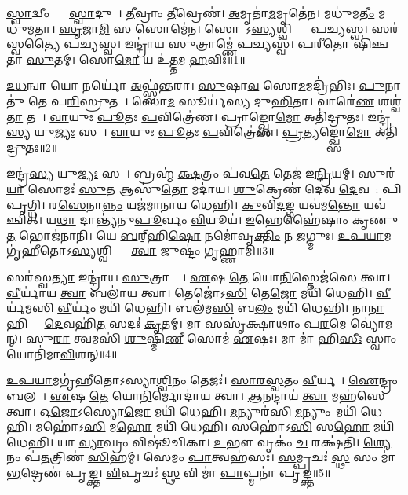 \clearpage
{}
\setcounter{anuvakam}{0}

\ul{𑌸𑍍𑌵𑌾}𑌦𑍍𑌵𑍀𑌂 𑌤𑍍𑌵𑌾᳚ \ul{𑌸𑍍𑌵𑌾}𑌦𑍁𑌨𑌾᳚।
\ul{𑌤𑍀}𑌵𑍍𑌰𑌾𑌂 \ul{𑌤𑍀}𑌵𑍍𑌰𑍇𑌣॑।
\ul{𑌅}𑌮𑍃𑌤𑌾॑\ul{𑌮}𑌮𑍃𑌤𑍇॑𑌨।
𑌮𑌧𑍁॑𑌮\ul{𑌤𑍀𑌂} 𑌮𑌧𑍁॑𑌮𑌤𑌾।
\ul{𑌸𑍃}𑌜𑌾\ul{𑌮𑌿} 𑌸 𑌸𑍋𑌮𑍇॑𑌨।
𑌸𑍋𑌮𑍋᳚\-𑌽\ul{𑌸𑍍𑌯}𑌶𑍍𑌵𑌿𑌭𑍍𑌯𑌾𑌂᳚ 𑌪𑌚𑍍𑌯𑌸𑍍𑌵।
𑌸𑌰॑𑌸𑍍𑌵𑌤𑍍𑌯𑍈 𑌪𑌚𑍍𑌯𑌸𑍍𑌵।
𑌇𑌨𑍍𑌦𑍍𑌰𑌾॑𑌯 \ul{𑌸𑍁}𑌤𑍍𑌰𑌾𑌮𑍍𑌣𑍇॑ 𑌪𑌚𑍍𑌯𑌸𑍍𑌵।
𑌪\ul{𑌰𑍀}𑌤𑍋 𑌷𑌿॑𑌞𑍍𑌚𑌤𑌾 \ul{𑌸𑍁}𑌤𑌮𑍍।
𑌸𑍋\ul{𑌮𑍋} 𑌯 𑌉॑\ul{𑌤𑍍𑌤}𑌮 \ul{𑌹}𑌵𑌿𑌃॥1॥

\ul{𑌦}\ul{𑌧}𑌨𑍍𑌵𑌾 𑌯𑍋 𑌨𑌰𑍍𑌯𑍋॑ \ul{𑌅}𑌫𑍍𑌸𑍍𑌵॑𑌨𑍍𑌤𑌰𑌾।
\ul{𑌸𑍁}𑌷𑌾\ul{𑌵} 𑌸𑍋\ul{𑌮}𑌮𑌦𑍍𑌰𑌿॑𑌭𑌿𑌃।
\ul{𑌪𑍁}𑌨𑌾𑌤𑍁॑ 𑌤𑍇 𑌪\ul{𑌰𑌿}𑌸𑍍𑌰𑍁𑌤𑌮𑍍᳚।
𑌸𑍋\ul{𑌮}\ul{} 𑌸𑍂𑌰𑍍𑌯॑𑌸𑍍𑌯 𑌦𑍁\ul{𑌹𑌿}𑌤𑌾।
𑌵𑌾𑌰𑍇॑\ul{𑌣} 𑌶𑌶𑍍𑌵॑\ul{𑌤𑌾} 𑌤𑌨𑌾᳚।
\ul{𑌵𑌾}𑌯𑍁𑌃 \ul{𑌪𑍂}𑌤𑌃 \ul{𑌪}𑌵𑌿𑌤𑍍𑌰𑍇॑𑌣।
𑌪𑍍𑌰𑌾𑌙𑍍𑌖𑍍𑌸𑍋\ul{𑌮𑍋} 𑌅𑌤𑌿॑𑌦𑍍𑌰𑍁𑌤𑌃।
𑌇𑌨𑍍𑌦𑍍𑌰॑\ul{𑌸𑍍𑌯} 𑌯𑍁\ul{𑌜𑍍𑌯𑌃} 𑌸𑌖𑌾᳚।
\ul{𑌵𑌾}𑌯𑍁𑌃 \ul{𑌪𑍂}𑌤𑌃 \ul{𑌪}𑌵𑌿𑌤𑍍𑌰𑍇॑𑌣।
\ul{𑌪𑍍𑌰}𑌤𑍍𑌯𑌙𑍍𑌖𑍍𑌸𑍋\ul{𑌮𑍋} 𑌅𑌤𑌿॑𑌦𑍍𑌰𑍁𑌤𑌃॥2॥

𑌇𑌨𑍍𑌦𑍍𑌰॑\ul{𑌸𑍍𑌯} 𑌯𑍁\ul{𑌜𑍍𑌯𑌃} 𑌸𑌖𑌾᳚।
𑌬𑍍𑌰𑌹𑍍𑌮॑ \ul{𑌕𑍍𑌷}𑌤𑍍𑌰𑌂 𑌪॑𑌵\ul{𑌤𑍇} 𑌤𑍇𑌜॑ 𑌇\ul{𑌨𑍍𑌦𑍍𑌰𑌿}𑌯𑌮𑍍।
𑌸𑍁𑌰॑\ul{𑌯𑌾} 𑌸𑍋𑌮𑌃॑ \ul{𑌸𑍁}𑌤 𑌆𑌸𑍁॑\ul{𑌤𑍋} 𑌮𑌦𑌾॑𑌯।
\ul{𑌶𑍁}𑌕𑍍𑌰𑍇𑌣॑ 𑌦𑍇𑌵 \ul{𑌦𑍇}𑌵𑌤𑌾᳚: 𑌪𑌿𑌪𑍃𑌗𑍍𑌧𑌿।
𑌰\ul{𑌸𑍇}𑌨𑌾\ul{𑌨𑍍𑌨𑌂} 𑌯𑌜॑𑌮𑌾𑌨𑌾𑌯 𑌧𑍇𑌹𑌿।
\ul{𑌕𑍁}𑌵𑌿\ul{𑌦}𑌙𑍍𑌗 𑌯𑌵॑𑌮\ul{𑌨𑍍𑌤𑍋} 𑌯𑌵॑𑌞𑍍𑌚𑌿𑌤𑍍।
𑌯\ul{𑌥𑌾} 𑌦𑌾𑌨𑍍𑌤𑍍𑌯॑𑌨𑍁\ul{𑌪𑍂}𑌰𑍍𑌵𑌂 \ul{𑌵𑌿}𑌯𑍂𑌯॑।
\ul{𑌇}𑌹𑍇𑌹𑍈॑𑌷𑌾𑌂 𑌕𑍃𑌣𑍁\ul{𑌤} 𑌭𑍋𑌜॑𑌨𑌾𑌨𑌿।
𑌯𑍇 \ul{𑌬}𑌰𑍍‌॒\mbox{}𑌹𑌿\ul{𑌷𑍋} 𑌨𑌮𑍋॑𑌵𑍃\ul{𑌕𑍍𑌤𑌿𑌂} 𑌨 \ul{𑌜}𑌗𑍍𑌮𑍁𑌃।
\ul{𑌉}\ul{𑌪}\ul{𑌯𑌾}𑌮𑌗𑍃॑𑌹𑍀𑌤𑍋\-𑌽\ul{𑌸𑍍𑌯}𑌶𑍍𑌵𑌿𑌭𑍍𑌯𑌾𑌂᳚ \ul{𑌤𑍍𑌵𑌾} 𑌜𑍁𑌷𑍍𑌟𑌂॑ 𑌗𑍃𑌹𑍍𑌣𑌾𑌮𑌿॥3॥

𑌸𑌰॑𑌸𑍍𑌵\ul{𑌤𑍍𑌯𑌾} 𑌇𑌨𑍍𑌦𑍍𑌰𑌾॑𑌯 \ul{𑌸𑍁}𑌤𑍍𑌰𑌾𑌮𑍍𑌣𑍇᳚।
\ul{𑌏}𑌷 \ul{𑌤𑍇} 𑌯𑍋\ul{𑌨𑌿}𑌸𑍍𑌤𑍇𑌜॑𑌸𑍇 𑌤𑍍𑌵𑌾।
\ul{𑌵𑍀}𑌰𑍍𑌯𑌾॑𑌯 \ul{𑌤𑍍𑌵𑌾} 𑌬𑌲𑌾॑𑌯 𑌤𑍍𑌵𑌾।
𑌤𑍇𑌜𑍋॑𑌽\ul{𑌸𑌿} 𑌤𑍇\ul{𑌜𑍋} 𑌮𑌯𑌿॑ 𑌧𑍇𑌹𑌿।
\ul{𑌵𑍀}𑌰𑍍𑌯॑𑌮𑌸𑌿 \ul{𑌵𑍀}𑌰𑍍𑌯𑌂॑ 𑌮𑌯𑌿॑ 𑌧𑍇𑌹𑌿।
𑌬𑌲॑𑌮\ul{𑌸𑌿} 𑌬\ul{𑌲𑌂} 𑌮𑌯𑌿॑ 𑌧𑍇𑌹𑌿।
𑌨𑌾\ul{𑌨𑌾} 𑌹𑌿 𑌵𑌾𑌂᳚ \ul{𑌦𑍇}𑌵𑌹𑌿॑\ul{𑌤}\ul{} 𑌸𑌦𑌃॑ \ul{𑌕𑍃}𑌤𑌮𑍍।
𑌮𑌾 𑌸𑌸𑍃॑𑌕𑍍𑌷𑌾𑌥𑌾𑌂 𑌪\ul{𑌰}𑌮𑍇 𑌵𑍍𑌯𑍋॑𑌮𑌨𑍍।
𑌸𑍁\ul{𑌰𑌾} 𑌤𑍍𑌵𑌮𑌸𑌿॑ \ul{𑌶𑍁}𑌷𑍍𑌮𑌿\ul{𑌣𑍀} 𑌸𑍋𑌮॑ \ul{𑌏}𑌷𑌃।
𑌮𑌾 𑌮𑌾॑ 𑌹𑌿\ul{𑌸𑍀𑌃} 𑌸𑍍𑌵𑌾𑌂 𑌯𑍋𑌨𑌿॑𑌮𑌾\ul{𑌵𑌿}𑌶𑌨𑍍॥4॥

\ul{𑌉}\ul{𑌪}\ul{𑌯𑌾}𑌮𑌗𑍃॑𑌹𑍀𑌤𑍋\-𑌽𑌸𑍍𑌯𑌾\ul{𑌶𑍍𑌵𑌿}𑌨𑌂 𑌤𑍇𑌜𑌃॑।
\ul{𑌸𑌾}\ul{𑌰}\ul{𑌸𑍍𑌵}𑌤𑌂 \ul{𑌵𑍀}𑌰𑍍𑌯𑌮𑍍᳚।
\ul{𑌐}𑌨𑍍𑌦𑍍𑌰𑌂 𑌬𑌲𑌮𑍍᳚।
\ul{𑌏}𑌷 \ul{𑌤𑍇} 𑌯𑍋\ul{𑌨𑌿}𑌰𑍍𑌮𑍋𑌦𑌾॑𑌯 𑌤𑍍𑌵𑌾।
\ul{𑌆}\ul{𑌨}𑌨𑍍𑌦𑌾𑌯॑ \ul{𑌤𑍍𑌵𑌾} 𑌮𑌹॑𑌸𑍇 𑌤𑍍𑌵𑌾।
𑌓\ul{𑌜𑍋}𑌽𑌸𑍍𑌯𑍋\ul{𑌜𑍋} 𑌮𑌯𑌿॑ 𑌧𑍇𑌹𑌿।
\ul{𑌮}𑌨𑍍𑌯𑍁𑌰॑𑌸𑌿 \ul{𑌮}𑌨𑍍𑌯𑍁𑌂 𑌮𑌯𑌿॑ 𑌧𑍇𑌹𑌿।
𑌮𑌹𑍋॑𑌽\ul{𑌸𑌿} 𑌮\ul{𑌹𑍋} 𑌮𑌯𑌿॑ 𑌧𑍇𑌹𑌿।
𑌸𑌹𑍋॑𑌽\ul{𑌸𑌿} 𑌸\ul{𑌹𑍋} 𑌮𑌯𑌿॑ 𑌧𑍇𑌹𑌿।
𑌯𑌾 \ul{𑌵𑍍𑌯𑌾}𑌘𑍍𑌰𑌂 𑌵𑌿𑌷𑍂॑𑌚𑌿𑌕𑌾।
\ul{𑌉}𑌭𑍗 𑌵𑍃𑌕𑌂॑ \ul{𑌚} 𑌰𑌕𑍍𑌷॑𑌤𑌿।
\ul{𑌶𑍍𑌯𑍇}𑌨𑌂 𑌪॑\ul{𑌤}𑌤𑍍𑌰𑌿𑌣॑ \ul{𑌸𑌿}\ul{}𑌹𑌮𑍍।
𑌸𑍇𑌮𑌂 \ul{𑌪𑌾}𑌤𑍍𑌵𑌹॑𑌸𑌃।
\ul{𑌸}𑌮𑍍𑌪𑍃𑌚𑌃॑ \ul{𑌸𑍍𑌥} 𑌸𑌂 𑌮𑌾॑ \ul{𑌭}𑌦𑍍𑌰𑍇𑌣॑ 𑌪𑍃𑌙𑍍𑌕𑍍𑌤।
\ul{𑌵𑌿}𑌪𑍃𑌚𑌃॑ \ul{𑌸𑍍𑌥} 𑌵𑌿 𑌮𑌾॑ \ul{𑌪𑌾}𑌪𑍍𑌮𑌨𑌾॑ 𑌪𑍃𑌙𑍍𑌕𑍍𑌤॥5॥\anuvakamend[\ul{𑌹}𑌵𑌿𑌃 \ul{𑌪𑍍𑌰}𑌤𑍍𑌯𑌙𑍍𑌖𑍍𑌸𑍋\ul{𑌮𑍋} 𑌅𑌤𑌿॑𑌦𑍍𑌰𑍁𑌤𑍋 𑌗𑍃𑌹𑍍𑌣𑌾𑌮𑍍𑌯𑌾\ul{𑌵𑌿}𑌶𑌨𑍍𑌵𑌿𑌷𑍂॑𑌚𑌿\ul{𑌕𑌾} 𑌪𑌞𑍍𑌚॑ 𑌚]

